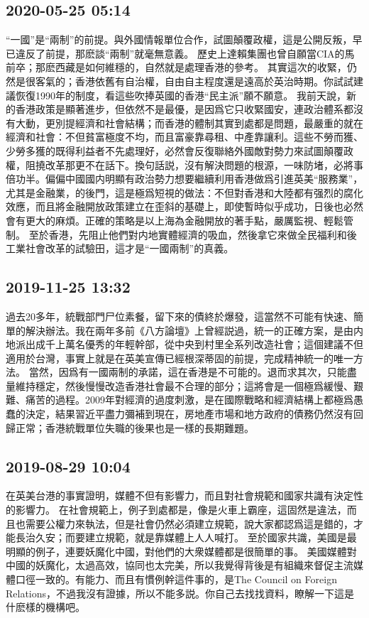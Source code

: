 \documentclass[twocolumn]{ctexart}
\begin{document}
\subsection*{2020-05-25 05:14}

“一國”是“兩制”的前提。與外國情報單位合作，試圖顛覆政權，這是公開反叛，早已違反了前提，那麽談“兩制”就毫無意義。
歷史上達賴集團也曾自願當CIA的馬前卒；那麽西藏是如何維穩的，自然就是處理香港的參考。
其實這次的收緊，仍然是很客氣的；香港依舊有自治權，自由自主程度還是遠高於英治時期。你試試建議恢復1990年的制度，看這些吹捧英國的香港“民主派”願不願意。
我前天說，新的香港政策是顯著進步，但依然不是最優，是因爲它只收緊國安，連政治體系都沒有大動，更別提經濟和社會結構；而香港的體制其實到處都是問題，最嚴重的就在經濟和社會：不但貧富極度不均，而且富豪靠尋租、中產靠讓利。這些不勞而獲、少勞多獲的既得利益者不先處理好，必然會反復聯絡外國敵對勢力來試圖顛覆政權，阻撓改革那更不在話下。換句話説，沒有解決問題的根源，一味防堵，必將事倍功半。偏偏中國國内明顯有政治勢力想要繼續利用香港做爲引進英美“服務業”，尤其是金融業，的後門，這是極爲短視的做法：不但對香港和大陸都有强烈的腐化效應，而且將金融開放政策建立在歪斜的基礎上，即使暫時似乎成功，日後也必然會有更大的麻煩。正確的策略是以上海為金融開放的著手點，嚴厲監視、輕鬆管制。
至於香港，先阻止他們對内地實體經濟的吸血，然後拿它來做全民福利和後工業社會改革的試驗田，這才是“一國兩制”的真義。
\subsection*{2019-11-25 13:32}

過去20多年，統戰部門尸位素餐，留下來的債終於爆發，這當然不可能有快速、簡單的解決辦法。我在兩年多前《八方論壇》上曾經説過，統一的正確方案，是由内地派出成千上萬名優秀的年輕幹部，從中央到村里全系列改造社會；這個建議不但適用於台灣，事實上就是在英美宣傳已經根深蒂固的前提，完成精神統一的唯一方法。 
當然，因爲有一國兩制的承諾，這在香港是不可能的。退而求其次，只能盡量維持穩定，然後慢慢改造香港社會最不合理的部分；這將會是一個極爲緩慢、艱難、痛苦的過程。2009年對經濟的過度刺激，是在國際戰略和經濟結構上都極爲愚蠢的決定，結果習近平盡力彌補到現在，房地產市場和地方政府的債務仍然沒有回歸正常；香港統戰單位失職的後果也是一樣的長期難題。
\subsection*{2019-08-29 10:04}

在英美台港的事實證明，媒體不但有影響力，而且對社會規範和國家共識有決定性的影響力。 
在社會規範上，例子到處都是，像是火車上霸座，這固然是違法，而且也需要公權力來執法，但是社會仍然必須建立規範，說大家都認爲這是錯的，才能長治久安；而要建立規範，就是靠媒體上人人喊打。 
至於國家共識，美國是最明顯的例子，連要妖魔化中國，對他們的大衆媒體都是很簡單的事。 
美國媒體對中國的妖魔化，太過高效，協同也太完美，所以我覺得背後是有組織來督促主流媒體口徑一致的。有能力、而且有慣例幹這件事的，是The Council on Foreign Relations，不過我沒有證據，所以不能多説。你自己去找找資料，瞭解一下這是什麽樣的機構吧。
\end{document}

